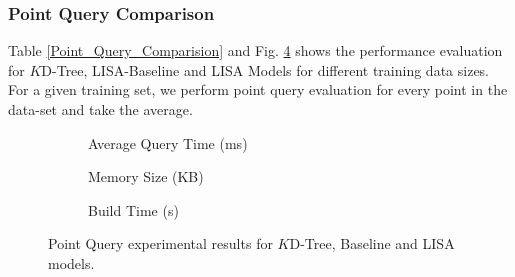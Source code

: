 \subsubsection{Point Query Comparison}
Table \ref{Point_Query_Comparision} and  Fig. \ref{fig:Point_Query_Comparision} shows the performance evaluation for $K$D-Tree, LISA-Baseline and LISA Models for different training data sizes. For a given training set, we perform point query evaluation for every point in the data-set and take the average. 

\begin{figure}
 	 \centering
     \begin{subfigure}[b]{0.32\textwidth}
         \centering
         
         \caption{Average Query Time (ms)}
         \label{fig:2d_exp2_1_1}
     \end{subfigure}
     \hfill
     \begin{subfigure}[b]{0.32\textwidth}
         \centering
         
         \caption{Memory Size (KB)}
         \label{fig:2d_exp2_1_2}
     \end{subfigure}
     \hfill
     \begin{subfigure}[b]{0.32\textwidth}
         \centering
         
         \caption{Build Time (s)}
         \label{fig:2d_exp2_1_3}
     \end{subfigure}
     \hfill
     \caption{Point Query experimental results for $K$D-Tree, Baseline and LISA models.}
     \label{fig:Point_Query_Comparision}
\end{figure}

